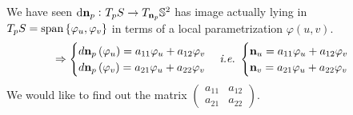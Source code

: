 We have seen \(\dd{\vb{n}}_p\colon T_p S\to T_{\vb{n}_p}\mathbb{S}^2\)
has image actually lying in \(T_p S=\operatorname{span}\left\{\varphi_u,
\varphi_v\right\}\) in terms of a local parametrization \(\varphi(u,v)\).
\[
    \Rightarrow \begin{cases}
        d\vb{n}_p\left(\varphi_u\right)=a_{11}\varphi_u+a_{12}\varphi_v\\
        d\vb{n}_p\left(\varphi_v\right)=a_{21}\varphi_u+a_{22}\varphi_v
    \end{cases}
    \emph{i.e.}\ \begin{cases}
        \vb{n}_u=a_{11}\varphi_u+a_{12}\varphi_v\\
        \vb{n}_v=a_{21}\varphi_u+a_{22}\varphi_v
    \end{cases}
\]
We would like to find out the matrix \(\begin{pmatrix}
    a_{11}&a_{12}\\
    a_{21}&a_{22}
\end{pmatrix}\).

